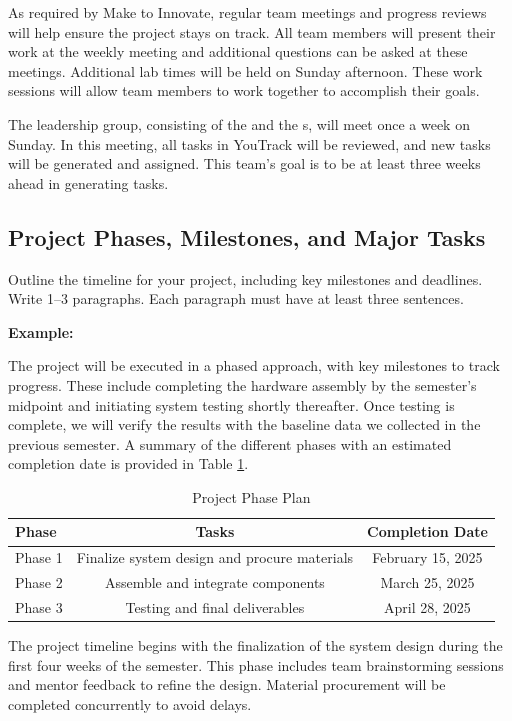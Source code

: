 As required by Make to Innovate, regular team meetings and progress reviews will help ensure the project stays on track. All team members will present their work at the weekly meeting and additional questions can be asked at these meetings. Additional lab times will be held on Sunday afternoon. These work sessions will allow team members to work together to accomplish their goals. 

The leadership group, consisting of the \pmgfull{} and the \tlfull{}s, will meet once a week on Sunday. In this meeting, all tasks in YouTrack will be reviewed, and new tasks will be generated and assigned. This team's goal is to be at least three weeks ahead in generating tasks. 

\subsection{Project Phases, Milestones, and Major Tasks}
Outline the timeline for your project, including key milestones and deadlines. Write 1–3 paragraphs. Each paragraph must have at least three sentences.

\textbf{Example:}

The project will be executed in a phased approach, with key milestones to track progress. These include completing the hardware assembly by the semester's midpoint and initiating system testing shortly thereafter. Once testing is complete, we will verify the results with the baseline data we collected in the previous semester. A summary of the different phases with an estimated completion date is provided in Table \ref{tab:phases}.

\begin{table}[ht!]
    \centering
    \begin{tabular}{|l|c|c|}
        \hline
        \textbf{Phase} & \textbf{Tasks} & \textbf{Completion Date} \\ \hline
        Phase 1 & Finalize system design and procure materials & February 15, 2025 \\ \hline
        Phase 2 & Assemble and integrate components & March 25, 2025 \\ \hline
        Phase 3 & Testing and final deliverables & April 28, 2025 \\ \hline
    \end{tabular}
    \caption{Project Phase Plan}
    \label{tab:phases}
\end{table}

The project timeline begins with the finalization of the system design during the first four weeks of the semester. This phase includes team brainstorming sessions and mentor feedback to refine the design. Material procurement will be completed concurrently to avoid delays.

